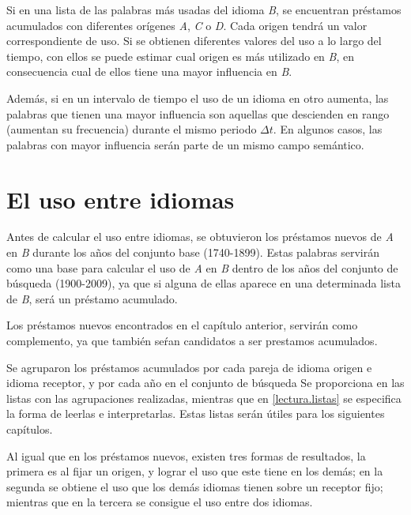 Si en una lista de las palabras más usadas del idioma \textit{B}, se encuentran préstamos acumulados con diferentes orígenes \textit{A}, \textit{C} o \textit{D}. Cada origen tendrá un valor correspondiente de uso. Si se obtienen diferentes valores del uso a lo largo del tiempo,  con ellos se puede estimar cual origen es más utilizado en \textit{B},  en consecuencia cual de ellos tiene una mayor influencia en \textit{B}.

Además, si en un intervalo de tiempo el uso de un idioma en otro aumenta, las palabras que tienen una mayor influencia son aquellas que descienden en rango (aumentan su frecuencia) durante el mismo periodo $\Delta t$. En algunos casos, las palabras con mayor influencia serán parte de un mismo campo semántico. 


\section {El uso entre idiomas} 

Antes de calcular el uso entre idiomas, se obtuvieron los préstamos nuevos de \textit{A} en \textit{B} durante los años del conjunto base (1740-1899).
Estas palabras servirán como una base para calcular el uso de \textit{A} en \textit{B} dentro de los años del conjunto de búsqueda (1900-2009), ya que si alguna de ellas aparece en una determinada lista de \textit{B}, será un préstamo acumulado. 

Los préstamos nuevos encontrados en el capítulo anterior, servirán como complemento, ya que también seŕan candidatos a ser prestamos acumulados.

Se agruparon los préstamos acumulados por cada pareja de idioma origen e idioma receptor, y por cada año en el conjunto de búsqueda  Se proporciona en \cite{prestamos_acumulados} las listas con las agrupaciones realizadas, mientras que en \ref{lectura.listas} se especifica la forma de leerlas e interpretarlas. Estas listas serán útiles para los siguientes capítulos. 

Al igual que en los préstamos nuevos, existen tres formas de resultados,  la primera es al fijar un origen,  y lograr el uso que este tiene en los demás; en la segunda se obtiene el uso que los demás idiomas tienen sobre un receptor fijo;  mientras que en la tercera se consigue el uso entre dos idiomas. 


